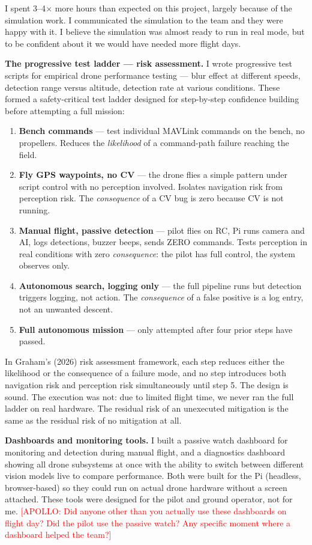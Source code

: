 I spent 3--4$\times$ more hours than expected on this project, largely because of the simulation work. I communicated the simulation to the team and they were happy with it. I believe the simulation was almost ready to run in real mode, but to be confident about it we would have needed more flight days.

\textbf{The progressive test ladder --- risk assessment.} I wrote progressive test scripts for empirical drone performance testing --- blur effect at different speeds, detection range versus altitude, detection rate at various conditions. These formed a safety-critical test ladder designed for step-by-step confidence building before attempting a full mission:

\begin{enumerate}[nosep]
\item \textbf{Bench commands} --- test individual MAVLink commands on the bench, no propellers. Reduces the \textit{likelihood} of a command-path failure reaching the field.
\item \textbf{Fly GPS waypoints, no CV} --- the drone flies a simple pattern under script control with no perception involved. Isolates navigation risk from perception risk. The \textit{consequence} of a CV bug is zero because CV is not running.
\item \textbf{Manual flight, passive detection} --- pilot flies on RC, Pi runs camera and AI, logs detections, buzzer beeps, sends ZERO commands. Tests perception in real conditions with zero \textit{consequence}: the pilot has full control, the system observes only.
\item \textbf{Autonomous search, logging only} --- the full pipeline runs but detection triggers logging, not action. The \textit{consequence} of a false positive is a log entry, not an unwanted descent.
\item \textbf{Full autonomous mission} --- only attempted after four prior steps have passed.
\end{enumerate}

In Graham's (2026) risk assessment framework, each step reduces either the likelihood or the consequence of a failure mode, and no step introduces both navigation risk and perception risk simultaneously until step 5. The design is sound. The execution was not: due to limited flight time, we never ran the full ladder on real hardware. The residual risk of an unexecuted mitigation is the same as the residual risk of no mitigation at all.

\textbf{Dashboards and monitoring tools.} I built a passive watch dashboard for monitoring and detection during manual flight, and a diagnostics dashboard showing all drone subsystems at once with the ability to switch between different vision models live to compare performance. Both were built for the Pi (headless, browser-based) so they could run on actual drone hardware without a screen attached. These tools were designed for the pilot and ground operator, not for me. \textcolor{red}{[APOLLO: Did anyone other than you actually use these dashboards on flight day? Did the pilot use the passive watch? Any specific moment where a dashboard helped the team?]}

